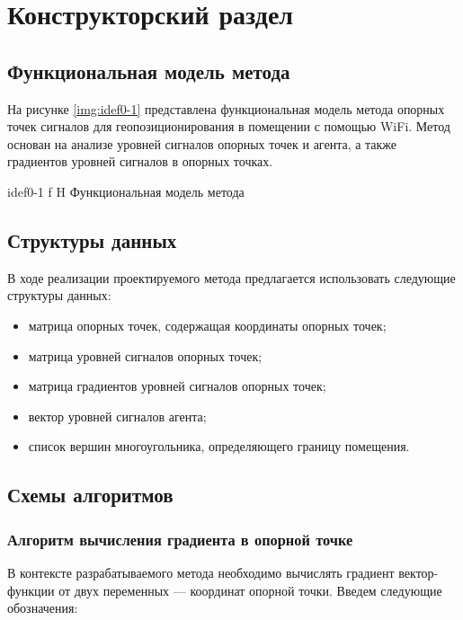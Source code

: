 \chapter{Конструкторский раздел}

\section{Функциональная модель метода}

На рисунке \ref{img:idef0-1} представлена функциональная модель метода опорных точек сигналов для геопозиционирования в помещении с помощью WiFi. Метод основан на анализе уровней сигналов опорных точек и агента, а также градиентов уровней сигналов в опорных точках.

    {idef0-1}
    {f}
    {H}
    {\linewidth}
    {Функциональная модель метода}

\section{Структуры данных}

В ходе реализации проектируемого метода предлагается использовать следующие структуры данных:

\begin{itemize}[label=---]
    \item матрица опорных точек, содержащая координаты опорных точек;
    \item матрица уровней сигналов опорных точек;
    \item матрица градиентов уровней сигналов опорных точек;
    \item вектор уровней сигналов агента;
    \item список вершин многоугольника, определяющего границу помещения.
\end{itemize}

\section{Схемы алгоритмов}

\subsection{Алгоритм вычисления градиента в опорной точке}

В контексте разрабатываемого метода необходимо вычислять градиент вектор-функции от двух переменных --- координат опорной точки. Введем следующие обозначения:

